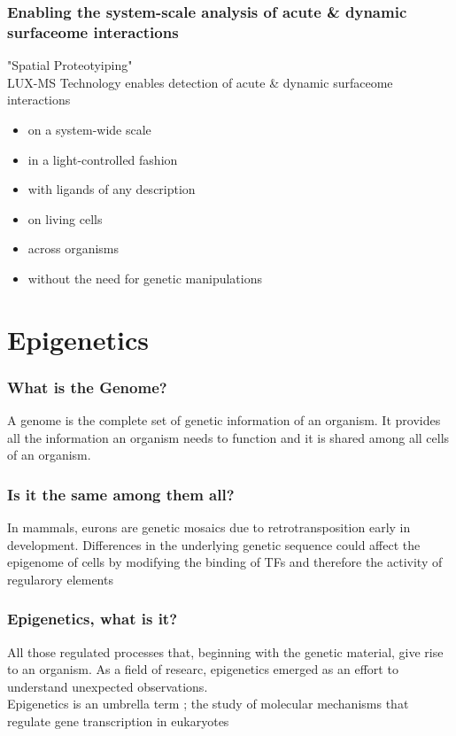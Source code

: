 \begin{itemize}
\begin{itemize}
\subsubsection{Enabling the system-scale analysis of acute & dynamic
surfaceome interactions}
"Spatial Proteotyiping"
\\LUX-MS Technology enables detection of
acute & dynamic 
surfaceome interactions
\begin{itemize}
    \item  on a system-wide scale
\item in a light-controlled fashion
\item with ligands of any description
\item on living cells
\item across organisms
\item without the need for genetic manipulations
\end{itemize}

\section{Epigenetics}
\subsubsection{What is the Genome?}
A genome is the complete set of genetic information of an organism. It provides all the information an organism needs to function and it is shared among all cells of an organism.

\subsubsection{Is it the same among them all?}
In mammals, eurons are genetic mosaics due to retrotransposition early in development. Differences in the underlying genetic sequence could affect the epigenome of cells by modifying the binding of TFs and therefore the activity of regularory elements

\subsubsection{Epigenetics, what is it?}
All those regulated processes that, beginning with the genetic material, give rise to an organism.
As a field of researc, epigenetics emerged as an effort to understand unexpected observations.
\\Epigenetics is an umbrella term ; the study of molecular mechanisms that regulate gene transcription in eukaryotes



\end{itemize}
\end{itemize}
